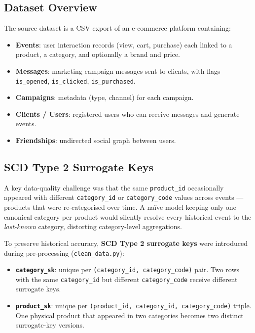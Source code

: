 \documentclass[12pt,a4paper]{article}
\begin{document}
\subsection{Dataset Overview}

The source dataset is a CSV export of an e-commerce platform containing:
\begin{itemize}
  \item \textbf{Events}: user interaction records (view, cart, purchase) each
        linked to a product, a category, and optionally a brand and price.
  \item \textbf{Messages}: marketing campaign messages sent to clients,
        with flags \texttt{is\_opened}, \texttt{is\_clicked}, \texttt{is\_purchased}.
  \item \textbf{Campaigns}: metadata (type, channel) for each campaign.
  \item \textbf{Clients / Users}: registered users who can receive messages
        and generate events.
  \item \textbf{Friendships}: undirected social graph between users.
\end{itemize}

\subsection{SCD Type 2 Surrogate Keys}

A key data-quality challenge was that the same \texttt{product\_id} occasionally
appeared with different \texttt{category\_id} or \texttt{category\_code} values
across events — products that were re-categorised over time.
A naïve model keeping only one canonical category per product would
silently resolve every historical event to the \emph{last-known} category,
distorting category-level aggregations.

To preserve historical accuracy, \textbf{SCD Type 2 surrogate keys} were
introduced during pre-processing (\texttt{clean\_data.py}):

\begin{itemize}
  \item \textbf{\texttt{category\_sk}}: unique per \texttt{(category\_id, category\_code)} pair.
        Two rows with the same \texttt{category\_id} but different
        \texttt{category\_code} receive different surrogate keys.
  \item \textbf{\texttt{product\_sk}}: unique per
        \texttt{(product\_id, category\_id, category\_code)} triple.
        One physical product that appeared in two categories becomes two
        distinct surrogate-key versions.
\end{itemize}
\end{document}
